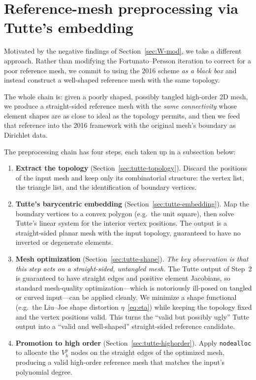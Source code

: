 \documentclass[11pt]{article}
\begin{document}
\section{Reference-mesh preprocessing via Tutte's embedding}
\label{sec:tutte}

Motivated by the negative findings of Section~\ref{sec:W-mod}, we
take a different approach. Rather than modifying the Fortunato--Persson
iteration to correct for a poor reference mesh, we commit to using
the 2016 scheme \emph{as a black box} and instead construct a
well-shaped reference mesh with the same topology.

The whole chain is: given a poorly shaped, possibly tangled high-order 2D mesh, we
produce a straight-sided reference mesh with the \emph{same
connectivity} whose element shapes are as close to ideal as the
topology permits, and then we feed that reference into the
2016 framework with the original mesh's boundary as
Dirichlet data.

The preprocessing chain has four steps, each taken up in a
subsection below:

\begin{enumerate}
  \item \textbf{Extract the topology} (Section~\ref{sec:tutte-topology}).
    Discard the positions of the input mesh and keep only its
    combinatorial structure: the vertex list, the triangle list,
    and the identification of boundary vertices.
  \item \textbf{Tutte's barycentric embedding}
    (Section~\ref{sec:tutte-embedding}). Map the boundary vertices
    to a convex polygon (e.g.\ the unit square), then solve
    Tutte's linear system for the interior vertex positions. The
    output is a straight-sided planar mesh with the input topology,
    guaranteed to have no inverted or degenerate elements.
  \item \textbf{Mesh optimization}
    (Section~\ref{sec:tutte-shape}). \emph{The key observation
    is that this step acts on a straight-sided, untangled mesh.}
    The Tutte output of Step~2 is guaranteed to have straight
    edges and positive element Jacobians, so standard mesh-quality
    optimization---which is notoriously ill-posed on tangled or
    curved input---can be applied cleanly. We minimize a shape
    functional (e.g.\ the Liu--Joe shape distortion
    $\eta$~\eqref{eq:eta}) while keeping the topology fixed and
    the vertex positions valid. This turns the ``valid but
    possibly ugly'' Tutte output into a ``valid and well-shaped''
    straight-sided reference candidate.
  \item \textbf{Promotion to high order}
    (Section~\ref{sec:tutte-highorder}). Apply \texttt{nodealloc}
    to allocate the $V_h^p$ nodes on the straight edges of the
    optimized mesh, producing a valid high-order reference mesh
    that matches the input's polynomial degree.
\end{enumerate}
\end{document}
